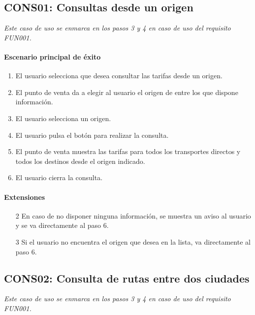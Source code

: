   \subsection{CONS01: Consultas desde un origen}
    \emph{Este caso de uso se enmarca en los pasos 3 y 4 en caso de uso del requisito FUN001.}
    \paragraph{Escenario principal de éxito}
    \begin{enumerate}
      \item El usuario selecciona que desea consultar las tarifas desde un origen.
      \item El punto de venta da a elegir al usuario el origen de entre los que dispone información.
      \item El usuario selecciona un origen.
      \item El usuario pulsa el botón para realizar la consulta.
      \item El punto de venta muestra las tarifas para todos los transportes directos y todos los destinos desde el origen indicado.
      \item El usuario cierra la consulta.
    \end{enumerate}

    \paragraph{Extensiones}
    \begin{enumerate}
      \item[2] En caso de no disponer ninguna información, se muestra un aviso al usuario y se va directamente al paso 6.
      \item[3] Si el usuario no encuentra el origen que desea en la lista, va directamente al paso 6.
    \end{enumerate}

  \subsection{CONS02: Consulta de rutas entre dos ciudades}
    \emph{Este caso de uso se enmarca en los pasos 3 y 4 en caso de uso del requisito FUN001.}
